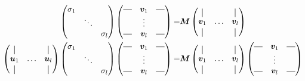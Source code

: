 \begin{align}
\begin{pmatrix}
        \sigma_1 &        &          \\
                    & \ddots &          \\ 
                    &        & \sigma_l
    \end{pmatrix}
    \begin{pmatrix}
        \horzbar & \bm{v}_1 & \horzbar \\
                    & \vdots   &  \\
        \horzbar & \bm{v}_l &  \horzbar \\
    \end{pmatrix} 
        =&
    \bm{M}
    \begin{pmatrix}
    \vertbar &        & \vertbar \\
    \bm{v}_1 & \hdots & \bm{v}_l \\
    \vertbar &        & \vertbar 
    \end{pmatrix} \\
    \begin{pmatrix}
    \vertbar &        & \vertbar \\
    \bm{u}_1 & \hdots & \bm{u}_l \\
    \vertbar &        & \vertbar 
    \end{pmatrix}
    \begin{pmatrix}
        \sigma_1 &        &          \\
                    & \ddots &          \\ 
                    &        & \sigma_l
    \end{pmatrix}
    \begin{pmatrix}
        \horzbar & \bm{v}_1 & \horzbar \\
                    & \vdots   &  \\
        \horzbar & \bm{v}_l &  \horzbar \\
    \end{pmatrix} 
    =&
    \bm{M}
    \begin{pmatrix}
    \vertbar &        & \vertbar \\
    \bm{v}_1 & \hdots & \bm{v}_l \\
    \vertbar &        & \vertbar 
    \end{pmatrix}
    \begin{pmatrix}
        \horzbar & \bm{v}_1 & \horzbar \\
                    & \vdots   &  \\
        \horzbar & \bm{v}_l &  \horzbar \\
    \end{pmatrix} 
    \label{eq:svd_partial}
\end{align}

